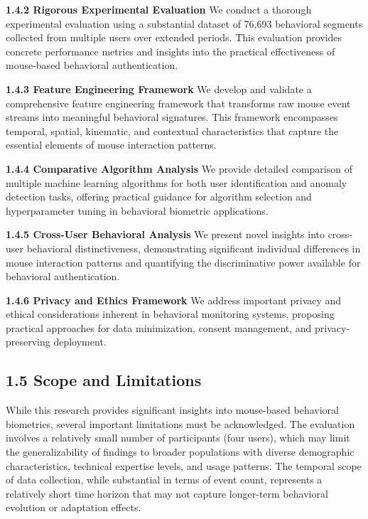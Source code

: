 \documentclass[
  11pt,
  a4paper,
]{article}
\begin{document}
\textbf{1.4.2 Rigorous Experimental Evaluation} We conduct a thorough
experimental evaluation using a substantial dataset of 76,693 behavioral
segments collected from multiple users over extended periods. This
evaluation provides concrete performance metrics and insights into the
practical effectiveness of mouse-based behavioral authentication.

\textbf{1.4.3 Feature Engineering Framework} We develop and validate a
comprehensive feature engineering framework that transforms raw mouse
event streams into meaningful behavioral signatures. This framework
encompasses temporal, spatial, kinematic, and contextual characteristics
that capture the essential elements of mouse interaction patterns.

\textbf{1.4.4 Comparative Algorithm Analysis} We provide detailed
comparison of multiple machine learning algorithms for both user
identification and anomaly detection tasks, offering practical guidance
for algorithm selection and hyperparameter tuning in behavioral
biometric applications.

\textbf{1.4.5 Cross-User Behavioral Analysis} We present novel insights
into cross-user behavioral distinctiveness, demonstrating significant
individual differences in mouse interaction patterns and quantifying the
discriminative power available for behavioral authentication.

\textbf{1.4.6 Privacy and Ethics Framework} We address important privacy
and ethical considerations inherent in behavioral monitoring systems,
proposing practical approaches for data minimization, consent
management, and privacy-preserving deployment.

\subsection{1.5 Scope and Limitations}\label{scope-and-limitations}

While this research provides significant insights into mouse-based
behavioral biometrics, several important limitations must be
acknowledged. The evaluation involves a relatively small number of
participants (four users), which may limit the generalizability of
findings to broader populations with diverse demographic
characteristics, technical expertise levels, and usage patterns. The
temporal scope of data collection, while substantial in terms of event
count, represents a relatively short time horizon that may not capture
longer-term behavioral evolution or adaptation effects.
\end{document}

